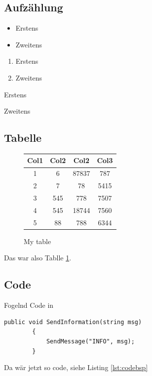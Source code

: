 \subsection{Aufzählung}
\begin{itemize}
    \item Erstens
    \item Zweitens
\end{itemize}

\begin{enumerate}
    \item Erstens
    \item Zweitens
\end{enumerate}

\begin{description}
    \item Erstens
    \item Zweitens
\end{description}

\subsection{Tabelle}
\begin{figure}[!h]
    \centering
  \begin{tabular}{| c | c | c | c |}
    \hline
    Col1 & Col2 & Col2 & Col3 \\ [0.5ex]
    \hline\hline
    1 & 6 & 87837 & 787 \\
    \hline
    2 & 7 & 78 & 5415 \\
    \hline
    3 & 545 & 778 & 7507 \\
    \hline
    4 & 545 & 18744 & 7560 \\
    \hline
    5 & 88 & 788 & 6344 \\ [1ex]
    \hline
  \end{tabular}
  \label{tab:tabbsp}
  \caption{My table}
\end{figure}
Das war also Tablle \ref{tab:tabbsp}.

\subsection{Code}
Fogelnd Code in \Csharp
\lstset{style=sharpc}
\begin{lstlisting}[caption={My Caption}, captionpos=b, label={lst:codebsp}]
        public void SendInformation(string msg)
        {
            SendMessage("INFO", msg);
        }
\end{lstlisting}
Da wär jetzt so code, siehe Listing \ref{lst:codebsp}
